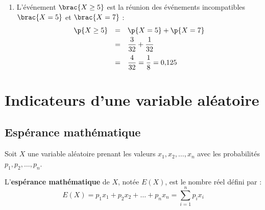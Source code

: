 \begin{methode}
\begin{correction}
\begin{enumerate}
			      D'où la loi de probabilité de $X$ :
			      \begin{center}
				      \begin{tabular}{|c|c|c|c|c|} \hline
					      \ccg$x_i$                               & $-1$             & $2$             & $5$             & $7$             \\ \hline
					      \ccg\rule[-4mm]{0mm}{11mm}$\p{X = x_i}$ & $\dfrac{21}{32}$ & $\dfrac{7}{32}$ & $\dfrac{3}{32}$ & $\dfrac{1}{32}$ \\ \hline
				      \end{tabular}
			      \end{center}

			      \ms

			      On contrôle que la somme vaut bien $\dfrac{21 + 7 + 3 + 1}{32} = \dfrac{32}{32} = 1$.

			\item L'événement $\brac{X \geq 5}$ est la réunion des événements incompatibles $\brac{X = 5}$ et $\brac{X = 7}$ :
			      \[
				      \begin{array}{rcl}
					      \p{X \geq 5} & = & \p{X = 5} + \p{X = 7}                  \\[1mm]
					                   & = & \dfrac{3}{32} + \dfrac{1}{32}          \\[3mm]
					                   & = & \dfrac{4}{32} = \dfrac{1}{8} = 0{,}125
				      \end{array}
			      \]
		\end{enumerate}
	\end{correction}
\end{methode}

\section{Indicateurs d'une variable aléatoire}

\subsection{Espérance mathématique}

\begin{defin}
	Soit $X$ une variable aléatoire prenant les valeurs $x_1, x_2, \dots, x_n$ avec les probabilités $p_1, p_2, \dots, p_n$.

	L'\textbf{espérance mathématique} de $X$, notée $E(X)$, est le nombre réel défini par :
	\[
		E(X) = p_1 x_1 + p_2 x_2 + \dots + p_n x_n = \sum_{i=1}^{n} p_i x_i
	\]
\end{defin}

